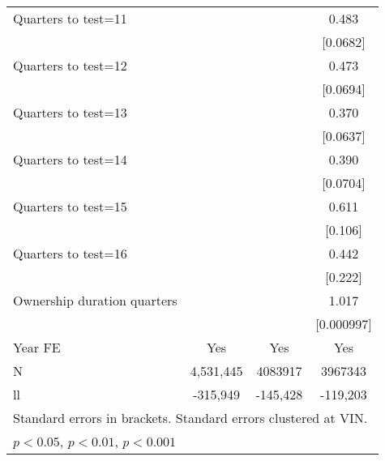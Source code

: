 \begin{longtable}{lccc}
Quarters to test=11 &                     &                     &       0.483\sym{***}\tabularnewline
                    &                     &                     &    [0.0682]         \tabularnewline
  
Quarters to test=12 &                     &                     &       0.473\sym{***}\tabularnewline
                    &                     &                     &    [0.0694]         \tabularnewline
  
Quarters to test=13 &                     &                     &       0.370\sym{***}\tabularnewline
                    &                     &                     &    [0.0637]         \tabularnewline
  
Quarters to test=14 &                     &                     &       0.390\sym{***}\tabularnewline
                    &                     &                     &    [0.0704]         \tabularnewline
  
Quarters to test=15 &                     &                     &       0.611\sym{**} \tabularnewline
                    &                     &                     &     [0.106]         \tabularnewline
  
Quarters to test=16 &                     &                     &       0.442         \tabularnewline
                    &                     &                     &     [0.222]         \tabularnewline
  
Ownership duration quarters&                     &                     &       1.017\sym{***}\tabularnewline
                    &                     &                     &  [0.000997]         \tabularnewline
  
Year FE             &         Yes         &         Yes         &         Yes         \tabularnewline
\midrule
N                   &     4,531,445         &     4083917         &     3967343         \tabularnewline
ll                  &   -315,949       &   -145,428         &   -119,203         \tabularnewline


\hline\hline
\multicolumn{4}{l}{\footnotesize Standard errors in brackets. Standard errors clustered at VIN.}\tabularnewline
\multicolumn{4}{l}{\footnotesize \sym{*} \(p<0.05\), \sym{**} \(p<0.01\), \sym{***} \(p<0.001\)}\tabularnewline
\end{longtable}

\pagebreak

